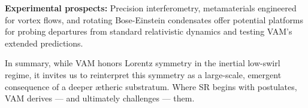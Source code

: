     \textbf{Experimental prospects:} Precision interferometry, metamaterials engineered for vortex flows, and rotating Bose-Einstein condensates offer potential platforms for probing departures from standard relativistic dynamics and testing VAM’s extended predictions.

    In summary, while VAM honors Lorentz symmetry in the inertial low-swirl regime, it invites us to reinterpret this symmetry as a large-scale, emergent consequence of a deeper ætheric substratum. Where SR begins with postulates, VAM derives — and ultimately challenges — them.



%    
%    
%
